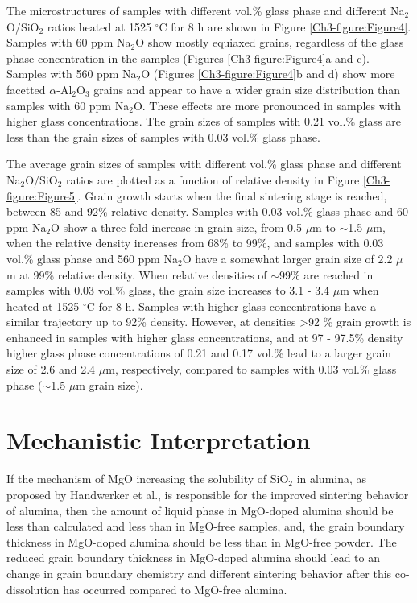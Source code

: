 The microstructures of samples with different vol.\% glass phase and different Na$_{2}$O/SiO$_{2}$ ratios heated at 1525 $^{\circ}$C for 8 h are shown in Figure \ref{Ch3-figure:Figure4}. Samples with 60 ppm Na$_{2}$O show mostly equiaxed grains, regardless of the glass phase concentration in the samples (Figures \ref{Ch3-figure:Figure4}a and c). Samples with 560 ppm Na$_{2}$O (Figures  \ref{Ch3-figure:Figure4}b and d) show more facetted $\alpha$-Al$_{2}$O$_{3}$ grains and appear to have a wider grain size distribution than samples with 60 ppm Na$_{2}$O. These effects are more pronounced in samples with higher glass concentrations. The grain sizes of samples with 0.21 vol.\% glass are less than the grain sizes of samples with 0.03 vol.\% glass phase. 

The average grain sizes of samples with different vol.\% glass phase and different Na$_{2}$O/SiO$_{2}$ ratios are plotted as a function of relative density in Figure \ref{Ch3-figure:Figure5}. Grain growth starts when the final sintering stage is reached, between 85 and 92\% relative density. Samples with 0.03 vol.\% glass phase and 60 ppm Na$_{2}$O show a three-fold increase in grain size, from 0.5 $\mu$m to $\sim$1.5 $\mu$m, when the relative density increases from 68\% to 99\%, and samples with 0.03 vol.\% glass phase and 560 ppm Na$_{2}$O have a somewhat larger grain size of 2.2 $\mu$m at 99\% relative density. When relative densities of $\sim$99\% are reached in samples with 0.03 vol.\% glass, the grain size increases to 3.1 - 3.4 $\mu$m when heated at 1525 $^{\circ}$C for 8 h. Samples with higher glass concentrations have a similar trajectory up to 92\% density. However, at densities >92 \% grain growth is enhanced in samples with higher glass concentrations, and at 97 - 97.5\% density higher glass phase concentrations of 0.21 and 0.17 vol.\% lead to a larger grain size of 2.6 and 2.4 $\mu$m, respectively, compared to samples with 0.03 vol.\% glass phase ($\sim$1.5 $\mu$m grain size). 

\section{Mechanistic Interpretation}

If the mechanism of MgO increasing the solubility of SiO$_{2}$ in alumina, as proposed by Handwerker et al., \cite{Handwerker1989} is responsible for the improved sintering behavior of alumina, then the amount of liquid phase in MgO-doped alumina should be less than calculated and less than in MgO-free samples, and, the grain boundary thickness in MgO-doped alumina should be less than in MgO-free powder. The reduced grain boundary thickness in MgO-doped alumina should lead to an change in grain boundary chemistry and different sintering behavior after this co-dissolution has occurred compared to MgO-free alumina. 

